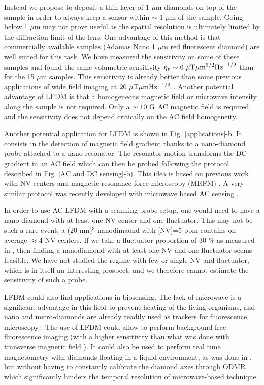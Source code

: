 \documentclass[a4paper, 11pt]{report}
\begin{document}
Instead we propose to deposit a thin layer of 1 $\mu$m diamonds on top of the sample in order to always keep a sensor within $\sim$ 1 $\mu$m of the sample. Going below 1 $\mu$m may not prove useful as the spatial resolution is ultimately limited by the diffraction limit of the lens. One advantage of this method is that commercially available samples (Adamas Nano 1 $\mu$m red fluorescent diamond) are well suited for this task. We have measured the sensitivity on some of these samples and found the same volumetric sensitivity $\eta_v \sim 6 \ \rm{\mu T}\mu \rm{m}^{3/2} \rm{Hz}^{-1/2}$ than for the 15 $\mu$m samples. This sensitivity is already better than some previous applications of wide field imaging at $20 \ \rm{\mu T}\mu \rm{m} \rm{Hz}^{-1/2}$ \citep{glenn2017micrometer}. Another potential advantage of LFDM is that a homogeneous magnetic field or microwave intensity along the sample is not required. Only a $\sim 10 \ \rm G$ AC magnetic field is required, and the sensitivity does not depend critically on the AC field homogeneity.

Another potential application for LFDM is shown in Fig. \ref{applications}-b. It consists in the detection of magnetic field gradient thanks to a nano-diamond probe attached to a nano-resonator. The resonator motion transforms the DC gradient in an AC field which can then be probed following the protocol described in Fig. \ref{AC and DC sensing}-b). This idea is based on previous work with NV centers \citep{arcizet2011single} and magnetic resonance force microscopy (MRFM) \citep{rugar2004single}. A very similar protocol was recently developed with microwave based AC sensing \citep{huxter2022scanning}. 

In order to use AC LFDM with a scanning probe setup, one would need to have a nano-diamond with at least one NV center and one fluctuator. This may not be such a rare event: a (20 nm)$^{3}$ nanodimaond with [NV]=5 ppm contains on average $\approx 4$ NV centers. If we take a fluctuator proportion of 30 \% as measured in \citep{choi2017depolarization}, then finding a nanodiamond with at least one NV and one fluctuator seems feasible. We have not studied the regime with few or single NV and fluctuator, which is in itself an interesting prospect, and we therefore cannot estimate the sensitivity of such a probe. 

LFDM could also find applications in biosensing. The lack of microwave is a significant advantage in this field to prevent heating of the living organisms, and nano and micro-diamonds are already readily used as trackers for fluorescence microscopy \citep{mohan2010vivo}. The use of LFDM could allow to perform background free fluorescence imaging (with a higher sensitivity than what was done with transverse magnetic field \citep{chapman2013background}). It could also be used to perform real time magnetometry with diamonds floating in a liquid environment, as was done in \citep{feng2021association}, but without having to constantly calibrate the diamond axes through ODMR which significantly hinders the temporal resolution of microwave-based technique.
\end{document}
